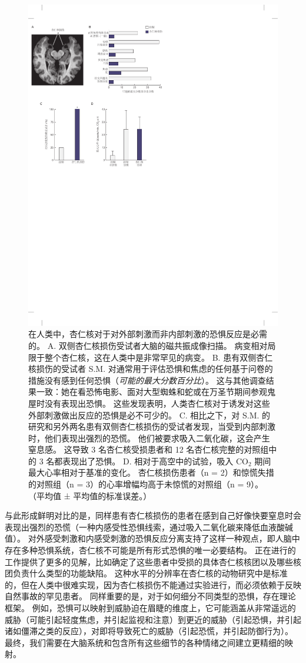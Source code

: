 \begin{figure}[htbp]
	\centering
	\includegraphics[width=0.82\linewidth]{chap42/fig_42_6}
	\caption{在人类中，杏仁核对于对外部刺激而非内部刺激的恐惧反应是必需的。
		A. 双侧杏仁核损伤受试者大脑的磁共振成像扫描。
		病变相对局限于整个杏仁核，这在人类中是非常罕见的病变。
		B. 患有双侧杏仁核损伤的受试者 S.M. 对通常用于评估恐惧和焦虑的任何基于问卷的措施没有感到任何恐惧（\textit{可能的最大分数百分比}）。
		这与其他调查结果一致：她在看恐怖电影、面对大型蜘蛛和蛇或在万圣节期间参观鬼屋时没有表现出恐惧。
		这些发现表明，人类杏仁核对于诱发对这些外部刺激做出反应的恐惧是必不可少的。
		C. 相比之下，对 S.M. 的研究和另外两名患有双侧杏仁核损伤的受试者发现，当受到内部刺激时，他们表现出强烈的恐慌。
		他们被要求吸入二氧化碳，这会产生窒息感。
		这导致 3 名杏仁核受损患者和 12 名杏仁核完整的对照组中的 3 名都表现出了恐惧。
		D. 相对于高空中的试验，吸入 CO$_2$ 期间最大心率相对于基准的变化。
		杏仁核损伤患者（n = 2）和惊慌失措的对照组（n = 3）的心率增幅均高于未惊慌的对照组（n = 9）。
		（平均值 ± 平均值的标准误差。）\cite{feinstein2011human} }
	\label{fig:42_6}
\end{figure}


与此形成鲜明对比的是，同样患有杏仁核损伤的患者在感到自己好像快要窒息时会表现出强烈的恐慌（一种内感受性恐惧线索，通过吸入二氧化碳来降低血液酸碱值）。
对外感受刺激和内感受刺激的恐惧反应分离支持了这样一种观点，即人脑中存在多种恐惧系统，杏仁核不可能是所有形式恐惧的唯一必要结构。
正在进行的工作提供了更多的见解，比如确定了这些患者中受损的具体杏仁核核团以及哪些核团负责什么类型的功能缺陷。
这种水平的分辨率在杏仁核的动物研究中是标准的，但在人类中很难实现，因为杏仁核损伤不能通过实验进行，而必须依赖于反映自然事故的罕见患者。
同样重要的是，对于如何细分不同类型的恐惧，存在理论框架。
例如，恐惧可以映射到威胁迫在眉睫的维度上，它可能涵盖从非常遥远的威胁（可能引起轻度焦虑，并引起监视和注意）到更近的威胁（引起恐惧，并引起诸如僵滞之类的反应），对即将导致死亡的威胁（引起恐慌，并引起防御行为）。
最终，我们需要在大脑系统和包含所有这些细节的各种情绪之间建立更精细的映射。


